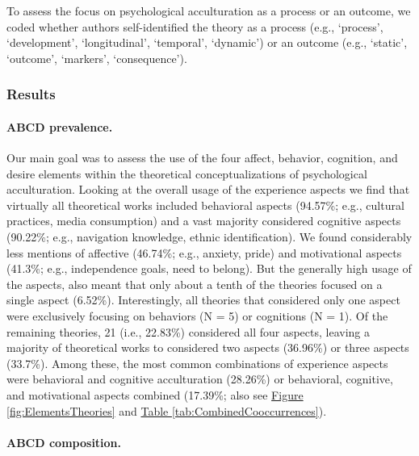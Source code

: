 \documentclass[man, 12pt, a4paper, mask]{apa7}
\newcommand{\fgrref}[2][]{\hyperref[#2]{Figure \ref*{#2}#1}}
\newcommand{\tblref}[2][]{\hyperref[#2]{Table \ref*{#2}#1}}
\begin{document}
To assess the focus on psychological acculturation as a process or an
outcome, we coded whether authors self-identified the theory as a
process (e.g., `process', `development', `longitudinal', `temporal',
`dynamic') or an outcome (e.g., `static', `outcome', `markers',
`consequence').

\subsubsection{Results}

\paragraph{ABCD prevalence.}

Our main goal was to assess the use of the four affect, behavior,
cognition, and desire elements within the theoretical conceptualizations
of psychological acculturation. Looking at the overall usage of the
experience aspects we find that virtually all theoretical works included
behavioral aspects (94.57\%; e.g., cultural practices, media
consumption) and a vast majority considered cognitive aspects (90.22\%;
e.g., navigation knowledge, ethnic identification). We found
considerably less mentions of affective (46.74\%; e.g., anxiety, pride)
and motivational aspects (41.3\%; e.g., independence goals, need to
belong). But the generally high usage of the aspects, also meant that
only about a tenth of the theories focused on a single aspect (6.52\%).
Interestingly, all theories that considered only one aspect were
exclusively focusing on behaviors (N = 5) or cognitions (N = 1). Of the
remaining theories, 21 (i.e., 22.83\%) considered all four aspects,
leaving a majority of theoretical works to considered two aspects
(36.96\%) or three aspects (33.7\%). Among these, the most common
combinations of experience aspects were behavioral and cognitive
acculturation (28.26\%) or behavioral, cognitive, and motivational
aspects combined (17.39\%; also see \fgrref{fig:ElementsTheories} and
\tblref{tab:CombinedCooccurrences}).

\paragraph{ABCD composition.}
\end{document}
